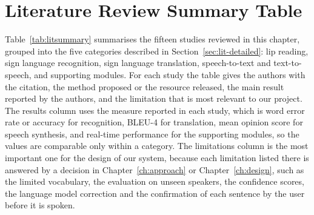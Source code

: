 \documentclass{FastFyp}
\begin{document}
\section{Literature Review Summary Table}
Table~\ref{tab:litsummary} summarises the fifteen studies reviewed in this chapter, grouped into the five categories described in Section~\ref{sec:lit-detailed}: lip reading, sign language recognition, sign language translation, speech-to-text and text-to-speech, and supporting modules. For each study the table gives the authors with the citation, the method proposed or the resource released, the main result reported by the authors, and the limitation that is most relevant to our project. The results column uses the measure reported in each study, which is word error rate or accuracy for recognition, BLEU-4 for translation, mean opinion score for speech synthesis, and real-time performance for the supporting modules, so the values are comparable only within a category. The limitations column is the most important one for the design of our system, because each limitation listed there is answered by a decision in Chapter~\ref{ch:approach} or Chapter~\ref{ch:design}, such as the limited vocabulary, the evaluation on unseen speakers, the confidence scores, the language model correction and the confirmation of each sentence by the user before it is spoken.
\end{document}
